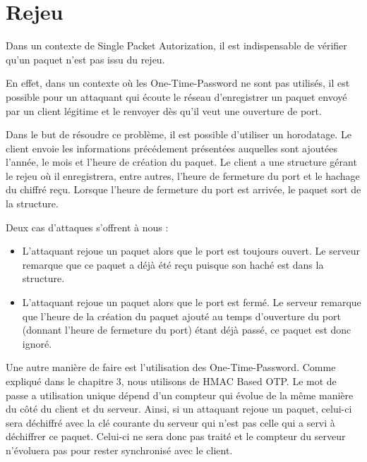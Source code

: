 \chapter{Rejeu}

Dans un contexte de Single Packet Autorization, il est indispensable de vérifier qu'un paquet n'est pas issu du rejeu.

En effet, dans un contexte où les One-Time-Password ne sont pas utilisés, il est possible pour un attaquant qui écoute le réseau d'enregistrer un paquet envoyé par un client légitime et le renvoyer dès qu'il veut une ouverture de port.

Dans le but de résoudre ce problème, il est possible d'utiliser un horodatage. Le client envoie les informations précédement présentées auquelles sont ajoutées l'année, le mois et l'heure de création du paquet. Le client a une structure gérant le rejeu où il enregistrera, entre autres, l'heure de fermeture du port et le hachage du chiffré reçu. Lorsque l'heure de fermeture du port est arrivée, le paquet sort de la structure.

Deux cas d'attaques s'offrent à nous :
\begin{itemize}
\item L'attaquant rejoue un paquet alors que le port est toujours ouvert. Le serveur remarque que ce paquet a déjà été reçu puisque son haché est dans la structure.
\item L'attaquant rejoue un paquet alors que le port est fermé. Le serveur remarque que l'heure de la création du paquet ajouté au temps d'ouverture du port (donnant l'heure de fermeture du port) étant déjà passé, ce paquet est donc ignoré.
\end{itemize}
\vspace{0.5cm}

Une autre manière de faire est l'utilisation des One-Time-Password. Comme expliqué dans le chapitre 3, nous utilisons de HMAC Based OTP. Le mot de passe a utilisation unique dépend d'un compteur qui évolue de la même manière du côté du client et du serveur.
Ainsi, si un attaquant rejoue un paquet, celui-ci sera déchiffré avec la clé courante du serveur qui n'est pas celle qui a servi à déchiffrer ce paquet. Celui-ci ne sera donc pas traité et le compteur du serveur n'évoluera pas pour rester synchronisé avec le client.
